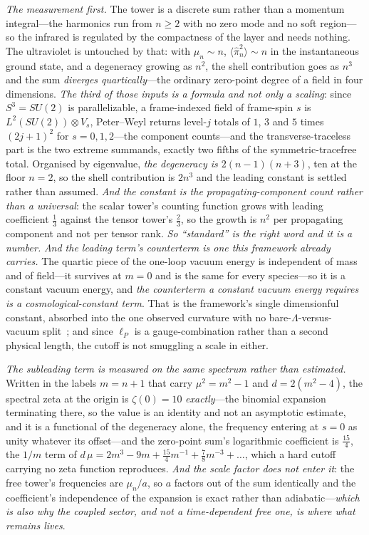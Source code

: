\documentclass[11pt,a4paper]{article}
\theoremstyle{plain}
\theoremstyle{definition}
\theoremstyle{remark}
\begin{document}
\emph{The measurement first.} The tower is a discrete sum rather than a momentum integral---the
harmonics run from $n\ge2$ with no zero mode and no soft region---so the infrared is regulated by the
compactness of the layer and needs nothing. The ultraviolet is untouched by that: with
$\mu_n\sim n$, $\langle\hat\pi_n^2\rangle\sim n$ in the instantaneous ground state, and a degeneracy
growing as $n^2$, the shell contribution goes as $n^3$ and the sum \emph{diverges quartically}---the
ordinary zero-point degree of a field in four dimensions. \emph{The third of those inputs is a
formula and not only a scaling}: since $S^{3}=SU(2)$ is parallelizable, a frame-indexed field of
frame-spin $s$ is $L^{2}(SU(2))\otimes V_{s}$, Peter--Weyl returns level-$j$ totals of $1$, $3$ and $5$
times $(2j+1)^{2}$ for $s=0,1,2$---the component counts---and the transverse-traceless part is the two
extreme summands, exactly two fifths of the symmetric-tracefree total. Organised by eigenvalue,
\emph{the degeneracy is $2(n-1)(n+3)$}, ten at the floor $n=2$, so the shell contribution is $2n^{3}$
and the leading constant is settled rather than
assumed.
\emph{And the constant is the propagating-component count rather than a universal}: the scalar tower's
counting function grows with leading coefficient $\tfrac13$ against the tensor tower's $\tfrac23$, so
the growth is $n^{2}$ per propagating component and not per tensor rank. \emph{So ``standard'' is the right word and
it is a number.} \emph{And the leading term's counterterm is one this framework already carries.}
The quartic piece of the one-loop vacuum energy is independent of mass and of field---it survives at
$m=0$ and is the same for every species---so it is a constant vacuum energy, and \emph{the counterterm
a constant vacuum energy requires is a cosmological-constant term}. That is the framework's single
dimensionful constant, absorbed into the one observed curvature with no bare-$\Lambda$-versus-vacuum
split~\cite{JanzenGeometricCore}; and since $\ell_P$ is a gauge-combination rather than a second
physical length, the cutoff is not smuggling a scale in either.

\emph{The subleading term is measured on the same spectrum rather than estimated.} Written in the
labels $m=n+1$ that carry $\mu^{2}=m^{2}-1$ and $d=2(m^{2}-4)$, the spectral zeta at the origin is
$\zeta(0)=10$ \emph{exactly}---the binomial expansion terminating there, so the value is an identity
and not an asymptotic estimate, and it is a functional of the degeneracy alone, the frequency entering
at $s=0$ as unity whatever its offset---and the zero-point sum's logarithmic coefficient is
$\tfrac{15}{4}$, the $1/m$ term of $d\,\mu=2m^{3}-9m+\tfrac{15}{4}m^{-1}+\tfrac78m^{-3}+\dots$, which a
hard cutoff carrying no zeta function reproduces. \emph{And the scale factor does not enter it}: the free tower's frequencies are
$\mu_{n}/a$, so $a$ factors out of the sum identically and the coefficient's independence of the
expansion is exact rather than adiabatic---\emph{which is also why the coupled sector, and not a
time-dependent free one, is where what remains
lives}.
\end{document}
